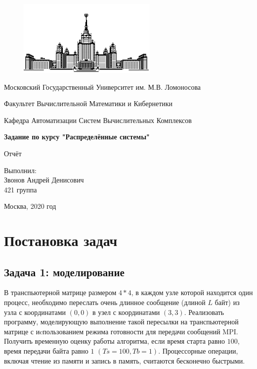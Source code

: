 \documentclass[a4paper]{article}
\begin{document}
\begin{titlepage}
\thispagestyle{empty}

\begin{center}
\begin{figure}[htbp]
  \centering
  \includegraphics[width=0.6\textwidth]{msu}
\end{figure}


Московский Государственный Университет им. М.В. Ломоносова

Факультет Вычислительной Математики и Кибернетики

Кафедра Автоматизации Систем Вычислительных Комплексов

\vfill
\textbf{\huge Задание по курсу "Распределённые системы"}

{\huge Отчёт}
\end{center}

\vfill
\begin{flushright}
{\large Выполнил:\\Звонов Андрей Денисович\\421 группа\\}
\end{flushright}

\centerline{Москва, 2020 год}

\end{titlepage}
\linespread{1.7}
\setcounter{page}{2}
\large

\tableofcontents
\newpage

\section{Постановка задач}

\subsection{Задача 1: моделирование}
В транспьютерной матрице размером $4*4$, в каждом узле которой находится один процесс, необходимо переслать очень длинное сообщение (длиной $L$ байт) из узла с координатами $(0, 0)$ в узел с координатами $(3, 3)$.
Реализовать программу, моделирующую выполнение такой пересылки на транспьютерной матрице с иcпользованием режима готовности для передачи сообщений MPI.
Получить временную оценку работы алгоритма, если время старта равно $100$, время передачи байта равно $1$ $(Ts=100, Tb=1)$. Процессорные операции, включая чтение из памяти и запись в память, считаются бесконечно быстрыми.
\end{document}
